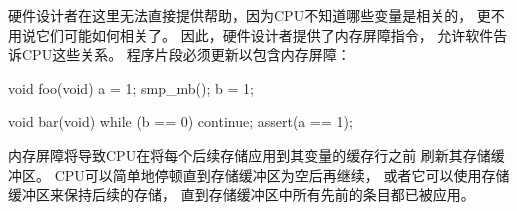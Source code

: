 \EQuickQuizEnd

\EQuickQuizEnd

硬件设计者在这里无法直接提供帮助，因为CPU不知道哪些变量是相关的，
更不用说它们可能如何相关了。
因此，硬件设计者提供了内存屏障指令，
允许软件告诉CPU这些关系。
程序片段必须更新以包含内存屏障：

\begin{VerbatimN}[fontsize=\footnotesize,samepage=true]
void foo(void)
{
	a = 1;
	smp_mb();
	b = 1;
}

void bar(void)
{
	while (b == 0) continue;
	assert(a == 1);
}
\end{VerbatimN}

内存屏障将导致CPU在将每个后续存储应用到其变量的缓存行之前
刷新其存储缓冲区。
CPU可以简单地停顿直到存储缓冲区为空后再继续，
或者它可以使用存储缓冲区来保持后续的存储，
直到存储缓冲区中所有先前的条目都已被应用。

